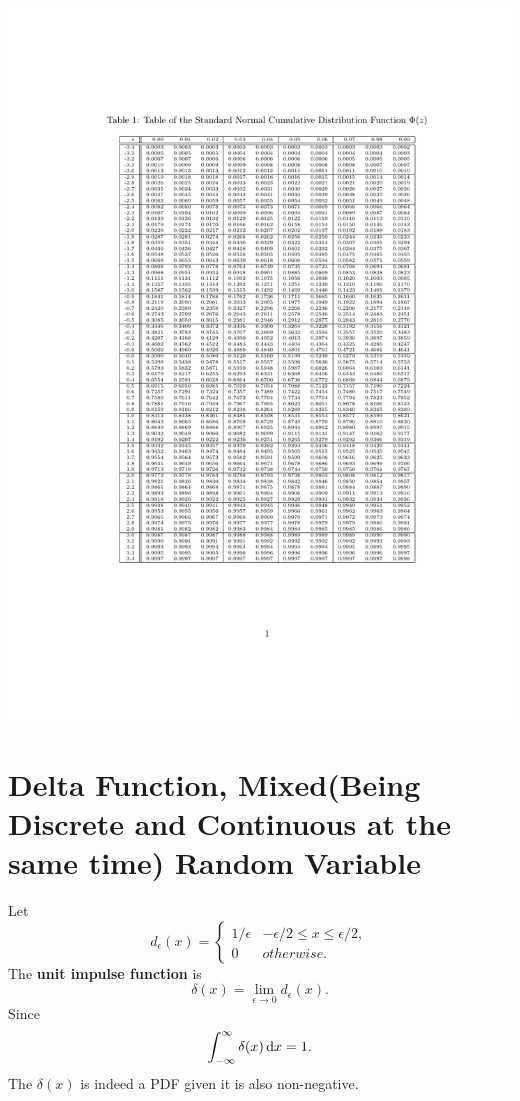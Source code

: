\includegraphics[width=\textwidth, center]{normal_cdf.pdf}

\section{Delta Function, Mixed(Being Discrete and Continuous at the same time) Random Variable}
\begin{definition}
    Let
    \[d_{\epsilon}(x)={
        \begin{cases}
            1/\epsilon & -\epsilon/2\leq x\leq \epsilon/2, \\
            0 & otherwise.
        \end{cases}
    }\]
    The \textbf{unit impulse function} is 
    \[\delta(x)=\lim_{\epsilon\rightarrow 0}d_{\epsilon}(x).\]
    Since 
    \[\int_{-\infty}^{\infty}\delta(x)\,\mathrm{d} x = 1.\]
    The $\delta(x)$ is indeed a PDF given it is also non-negative.
\end{definition}

